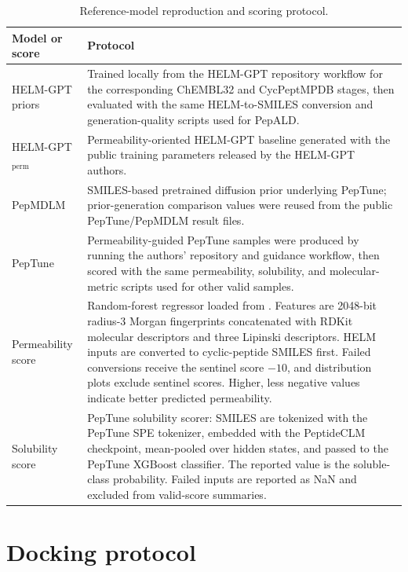 \documentclass[12pt]{article}
\begin{document}
\begin{table}[htbp]
\centering
\small
\caption{Reference-model reproduction and scoring protocol.}
\label{tab:sup_reference_models}
\begin{tabular}{L{0.23\textwidth}L{0.68\textwidth}}
\toprule
Model or score & Protocol \\
\midrule
HELM-GPT priors & Trained locally from the HELM-GPT repository workflow for the corresponding ChEMBL32 and CycPeptMPDB stages, then evaluated with the same HELM-to-SMILES conversion and generation-quality scripts used for PepALD. \\
HELM-GPT\(_{\mathrm{perm}}\) & Permeability-oriented HELM-GPT baseline generated with the public training parameters released by the HELM-GPT authors. \\
PepMDLM & SMILES-based pretrained diffusion prior underlying PepTune; prior-generation comparison values were reused from the public PepTune/PepMDLM result files. \\
PepTune & Permeability-guided PepTune samples were produced by running the authors' repository and guidance workflow, then scored with the same permeability, solubility, and molecular-metric scripts used for other valid samples. \\
Permeability score & Random-forest regressor loaded from . Features are 2048-bit radius-3 Morgan fingerprints concatenated with RDKit molecular descriptors and three Lipinski descriptors. HELM inputs are converted to cyclic-peptide SMILES first. Failed conversions receive the sentinel score \(-10\), and distribution plots exclude sentinel scores. Higher, less negative values indicate better predicted permeability. \\
Solubility score & PepTune solubility scorer: SMILES are tokenized with the PepTune SPE tokenizer, embedded with the PeptideCLM checkpoint, mean-pooled over hidden states, and passed to the PepTune XGBoost classifier. The reported value is the soluble-class probability. Failed inputs are reported as NaN and excluded from valid-score summaries. \\
\bottomrule
\end{tabular}
\end{table}
\FloatBarrier

\section{Docking protocol}
\label{supsec:docking_protocol}
\end{document}
